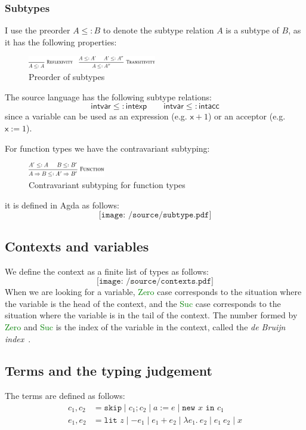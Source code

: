 \documentclass[12pt,a4paper]{report}
\theoremstyle{definition}
\newcommand{\gn}[1]{\textcolor{green}{#1}}
\newcommand{\gnt}[1]{\gn{\textsf{#1}}}
\begin{document}
        \subsubsection{Subtypes}
        I use the preorder $A ≤: B$ to denote the subtype relation $A$ is a subtype of $B$, as it has the following properties:
        \begin{figure}[H]
            \centering
            \includegraphics[width=0.5\textwidth]{subtype.pdf}
            \caption{Preorder of subtypes}
            \label{fig: subtype}
        \end{figure}

        The source language has the following subtype relations:
        \[ \textsf{intvar} \leq: \textsf{intexp} \qquad \textsf{intvar} \leq: \textsf{intacc} \]
        since a variable can be used as an expression (e.g. $\mathsf{x} + 1$) or an acceptor (e.g. $\mathsf{x} := 1$).

        For function types we have the contravariant subtyping:
        \begin{figure}[H]
            \centering
            \includegraphics[width=0.3\textwidth]{subtype_function.pdf}
            \caption{Contravariant subtyping for function types}
            \label{fig: subtype_fun}
        \end{figure}
        
        it is defined in Agda as follows:
        \[\texttt{[image: /source/subtype.pdf]}\]

        \subsection{Contexts and variables}
        We define the context as a finite list of types as follows:
        \[\texttt{[image: /source/contexts.pdf]}\]
        When we are looking for a variable, \gnt{Zero} case corresponds to the situation where the variable is the head of the context, and the \gnt{Suc} case corresponds to the situation where the variable is in the tail of the context. The number formed by \gnt{Zero} and \gnt{Suc} is the index of the variable in the context, called the \emph{de Bruijn index}~\autocite{de_bruijn}. 


        \subsection{Terms and the typing judgement} \label{subsec: terms}
        The terms are defined as follows:
        \[\begin{aligned}
            c_1, c_2 &= \texttt{skip} \mid c_1; c_2 \mid a := e \mid \texttt{new } x \texttt{ in } c_1 \\
            e_1, e_2 &= \texttt{lit } z \mid -e_1 \mid e_1 + e_2 \mid \lambda e_1.\ e_2 \mid e_1\ e_2 \mid x \\
        \end{aligned}\]
        
\end{document}
